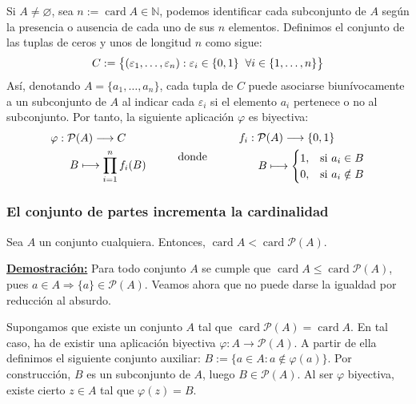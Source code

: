 \documentclass[12pt,a4paper]{article}
\newcommand{\card}{\operatorname{card}}
\newcommand{\N}{\mathbb{N}}
\newcommand{\dem}{
    \noindent \underline{\textbf{Demostración:}}
}
\begin{document}
\vspace{4mm}
Si $A \neq \varnothing$, sea $n := \card A \in \N$, podemos identificar cada subconjunto de $A$ según la presencia o ausencia de cada uno de sus $n$ elementos.
Definimos el conjunto de las tuplas de ceros y unos de longitud $n$ como sigue:
\vspace{-1ex}
$$C := \big\{(\varepsilon_1 , \ldots, \varepsilon_n) : \varepsilon_i \in \{0,1\} \hspace{2mm} \forall i \in \{1,\ldots,n\}\big\}$$
Así, denotando $A = \{a_1, \ldots, a_n\}$, cada tupla de $C$ puede asociarse biunívocamente a un subconjunto de $A$ al indicar cada
$\varepsilon_i$ si el elemento $a_i$ pertenece o no al subconjunto. Por tanto, la siguiente aplicación $\varphi$ es biyectiva:
\[
\begin{aligned}
    &\varphi : \mathcal{P}(A) \longrightarrow C \\
    &\hspace{6mm} B \longmapsto \prod_{i=1}^{n} f_i(B)
\end{aligned}
\hspace{10mm}
\text{donde}
\hspace{10mm}
\begin{aligned}
    &f_i : \mathcal{P}(A) \longrightarrow \{0,1\} \\
    &\hspace{6mm} B \longmapsto
    \begin{cases}
        1, & \text{si } a_i \in B \\
        0, & \text{si } a_i \notin B
    \end{cases}
\end{aligned}
\]

\vspace{6mm}
\subsubsection{El conjunto de partes incrementa la cardinalidad}
\hspace{3mm}
Sea $A$ un conjunto cualquiera. Entonces, $\card A < \card \mathcal{P}(A)$.

\vspace{4mm}
\dem Para todo conjunto $A$ se cumple que $\card A \leq \card \mathcal{P}(A)$,
pues $a \in A \Rightarrow \{a\} \in \mathcal{P}(A)$. Veamos ahora que no puede darse
la igualdad por reducción al absurdo.

\vspace{2mm}
Supongamos que existe un conjunto $A$ tal que $\card \mathcal{P}(A) = \card A$.
En tal caso, ha de existir una aplicación biyectiva $\varphi : A \to \mathcal{P}(A)$.
A partir de ella definimos el siguiente conjunto auxiliar: $B := \{a \in A : a \notin \varphi(a)\}$.
Por construcción, $B$ es un subconjunto de $A$, luego $B \in \mathcal{P}(A)$. Al ser $\varphi$ biyectiva,
existe cierto $z \in A$ tal que $\varphi(z) = B$.
\end{document}
